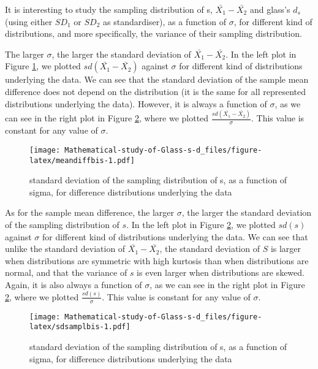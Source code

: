 \documentclass[
  man,floatsintext]{apa6}
\begin{document}
It is interesting to study the sampling distribution of s, \(\bar{X_1}-\bar{X_2}\) and glass's \(d_s\) (using either \(SD_1\) or \(SD_2\) as standardiser), as a function of \(\sigma\), for different kind of distributions, and more specifically, the variance of their sampling distribution.

The larger \(\sigma\), the larger the standard deviation of \(\bar{X_1}-\bar{X_2}\). In the left plot in Figure \ref{fig:meandiffbis}, we plotted \(sd(\bar{X_1}-\bar{X_2})\) against \(\sigma\) for different kind of distributions underlying the data. We can see that the standard deviation of the sample mean difference does not depend on the distribution (it is the same for all represented distributions underlying the data). However, it is always a function of \(\sigma\), as we can see in the right plot in Figure \ref{fig:sdsamplbis}, where we plotted \(\frac{sd(\bar{X_1}-\bar{X_2})}{\sigma}\). This value is constant for any value of \(\sigma\).

\begin{figure}
\centering
\texttt{[image: Mathematical-study-of-Glass-s-d\_files/figure-latex/meandiffbis-1.pdf]}
\caption{\label{fig:meandiffbis}standard deviation of the sampling distribution of s, as a function of sigma, for difference distributions underlying the data}
\end{figure}

As for the sample mean difference, the larger \(\sigma\), the larger the standard deviation of the sampling distribution of \(s\). In the left plot in Figure \ref{fig:sdsamplbis}, we plotted \(sd(s)\) against \(\sigma\) for different kind of distributions underlying the data. We can see that unlike the standard deviation of \(\bar{X_1}-\bar{X_2}\), the standard deviation of \(S\) is larger when distributions are symmetric with high kurtosis than when distributions are normal, and that the variance of \(s\) is even larger when distributions are skewed. Again, it is also always a function of \(\sigma\), as we can see in the right plot in Figure \ref{fig:sdsamplbis}, where we plotted \(\frac{sd(s)}{\sigma}\). This value is constant for any value of \(\sigma\).

\begin{figure}
\centering
\texttt{[image: Mathematical-study-of-Glass-s-d\_files/figure-latex/sdsamplbis-1.pdf]}
\caption{\label{fig:sdsamplbis}standard deviation of the sampling distribution of s, as a function of sigma, for difference distributions underlying the data}
\end{figure}
\end{document}

